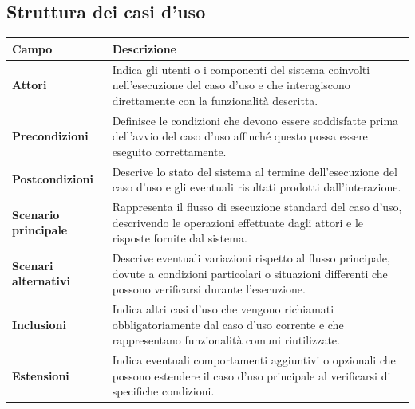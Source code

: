 \subsection{Struttura dei casi d'uso}

\begin{center}
        \begin{tabularx}{\textwidth}{|l|X|}
            \hline
            \rowcolor{gold}
            \textbf{Campo}  & \textbf{Descrizione} \\
            \hline
            \textbf{Attori} & Indica gli utenti o i componenti del sistema coinvolti nell'esecuzione del caso d'uso e che interagiscono direttamente con la funzionalità descritta.\\
            \hline
            \textbf{Precondizioni} & Definisce le condizioni che devono essere soddisfatte prima dell'avvio del caso d'uso affinché questo possa essere eseguito correttamente.\\
            \hline
            \textbf{Postcondizioni} & Descrive lo stato del sistema al termine dell'esecuzione del caso d'uso e gli eventuali risultati prodotti dall'interazione.\\
            \hline
            \textbf{Scenario principale} & Rappresenta il flusso di esecuzione standard del caso d'uso, descrivendo le operazioni effettuate dagli attori e le risposte 
            fornite dal sistema.\\
            \hline
            \textbf{Scenari alternativi} & Descrive eventuali variazioni rispetto al flusso principale, dovute a condizioni particolari o situazioni differenti che possono 
            verificarsi durante l'esecuzione.\\
            \hline
            \textbf{Inclusioni} & Indica altri casi d'uso che vengono richiamati obbligatoriamente dal caso d'uso corrente e che rappresentano funzionalità comuni riutilizzate.\\
            \hline
            \textbf{Estensioni} & Indica eventuali comportamenti aggiuntivi o opzionali che possono estendere il caso d'uso principale al verificarsi di specifiche condizioni.\\
            \hline
        \end{tabularx}
\end{center}

